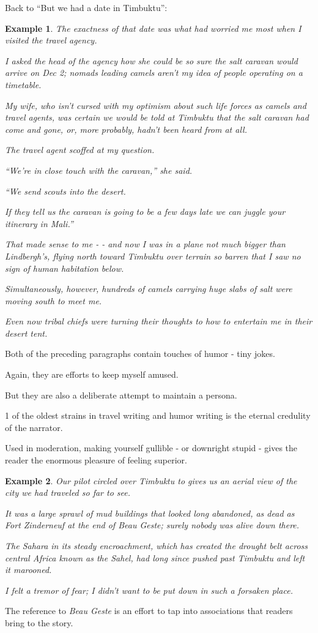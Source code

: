 \documentclass{book}
\numberwithin{equation}{section}
\newtheorem{example}{Example}[chapter]
\begin{document}
%
Back to ``But we had a date in Timbuktu'':
\begin{example}
    The exactness of that date was what had worried me most when I visited the travel agency.
    
    I asked the head of the agency how she could be so sure the salt caravan would arrive on Dec 2; nomads leading camels aren't my idea of people operating on a timetable.
    
    My wife, who isn't cursed with my optimism about such life forces as camels and travel agents, was certain we would be told at Timbuktu that the salt caravan had come and gone, or, more probably, hadn't been heard from at all.
    
    The travel agent scoffed at my question.
    
    ``We're in close touch with the caravan,'' she said.
    
    ``We send scouts into the desert.
    
    If they tell us the caravan is going to be a few days late we can juggle your itinerary in Mali.''
    
    That made sense to me -  - and now I was in a plane not much bigger than Lindbergh's, flying north toward Timbuktu over terrain so barren that I saw no sign of human habitation below.
    
    Simultaneously, however, hundreds of camels carrying huge slabs of salt were moving south to meet me.
    
    Even now tribal chiefs were turning their thoughts to how to entertain me in their desert tent.
\end{example}
Both of the preceding paragraphs contain touches of humor - tiny jokes.

Again, they are efforts to keep myself amused.

But they are also a deliberate attempt to maintain a persona.

1 of the oldest strains in travel writing and humor writing is the eternal credulity of the narrator.

Used in moderation, making yourself gullible - or downright stupid - gives the reader the enormous pleasure of feeling superior.
\begin{example}
    Our pilot circled over Timbuktu to gives us an aerial view of the city we had traveled so far to see.
    
    It was a large sprawl of mud buildings that looked long abandoned, as dead as Fort Zinderneuf at the end of \emph{Beau Geste}; surely nobody was alive down there.
    
    The Sahara in its steady encroachment, which has created the drought belt across central Africa known as the Sahel, had long since pushed past Timbuktu and left it marooned.
    
    I felt a tremor of fear; I didn't want to be put down in such a forsaken place.
\end{example}
The reference to \emph{Beau Geste} is an effort to tap into associations that readers bring to the story.
\end{document}
